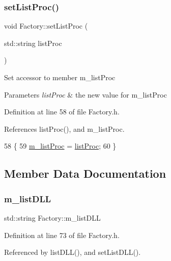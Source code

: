 \subsubsection{\texorpdfstring{set\+List\+Proc()}{setListProc()}}
{\footnotesize\ttfamily void Factory\+::set\+List\+Proc (\begin{DoxyParamCaption}\item[{std\+::string}]{list\+Proc }\end{DoxyParamCaption})\hspace{0.3cm}{\ttfamily [inline]}}

Set accessor to member m\+\_\+list\+Proc 
\begin{DoxyParams}{Parameters}
{\em list\+Proc} & the new value for m\+\_\+list\+Proc \\
\hline
\end{DoxyParams}


Definition at line 58 of file Factory.\+h.



References list\+Proc(), and m\+\_\+list\+Proc.


\begin{DoxyCode}
58                                         \{
59     \hyperlink{classFactory_aec20c1d0a1ef175f55a82e868edabe88}{m\_listProc} = \hyperlink{classFactory_afb222fc976d624fa6fdcb30f0aca586c}{listProc};
60   \}
\end{DoxyCode}


\subsection{Member Data Documentation}
\mbox{\label{classFactory_a266167ae49fcf4fa9baa5485dea4b062}} 
\subsubsection{\texorpdfstring{m\+\_\+list\+D\+LL}{m\_listDLL}}
{\footnotesize\ttfamily std\+::string Factory\+::m\+\_\+list\+D\+LL\hspace{0.3cm}{\ttfamily [private]}}



Definition at line 73 of file Factory.\+h.



Referenced by list\+D\+L\+L(), and set\+List\+D\+L\+L().


